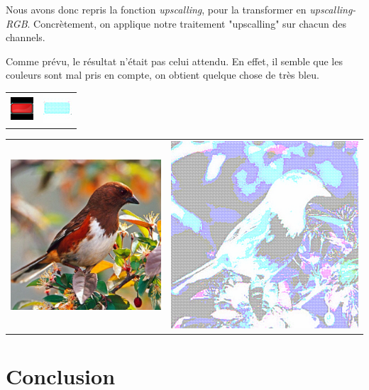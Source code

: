 \documentclass[12pt, a4paper]{article}
\begin{document}
Nous avons donc repris la fonction \emph{upscalling}, pour la transformer en \emph{upscalling-RGB}. Concrètement, on applique notre traitement "upscalling" sur chacun des channels. 

Comme prévu, le résultat n'était pas celui attendu. En effet, il semble que les couleurs sont mal pris en compte, on obtient quelque chose de très bleu. 

\begin{center}
\begin{tabular}{cc}
   \includegraphics[scale=2]{Images/rectangleR_original.png} &
   \includegraphics[scale=2]
   {Images/rectangleR_reconstruction.png} \\
\end{tabular}
\end{center}

\begin{center}
\begin{tabular}{cc}
   \includegraphics[scale=0.5]{Images/oiseau_original.png} &
   \includegraphics[scale=0.5]
   {Images/oiseau_reconstruction.png} \\
\end{tabular}

\end{center}

\section*{Conclusion}
\end{document}
